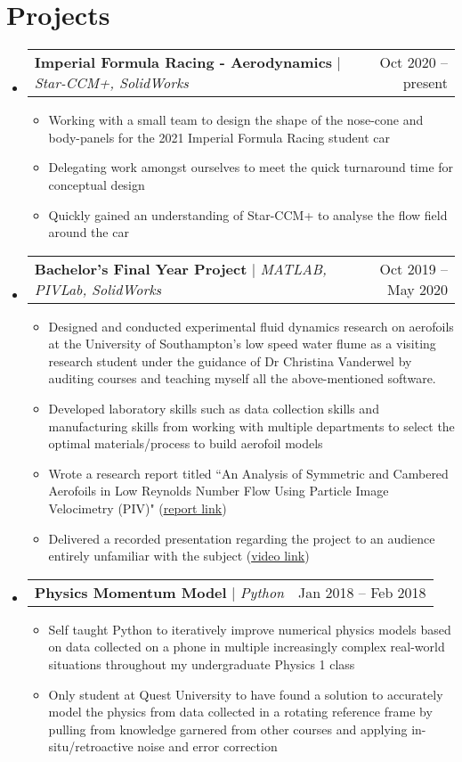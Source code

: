 \documentclass[a4paper,11pt]{article}
\makeatletter
\newcommand{\resumeItem}[1]{
  \item\small{
    {#1\vspace{-2pt}}
  }
}
\newcommand{\resumeProjectHeading}[2]{
    \item
    \begin{tabular*}{0.97\textwidth}{l@{\extracolsep{\fill}}r}
      \small#1 & #2 \\
    \end{tabular*}\vspace{-7pt}
}
\newcommand{\resumeSubHeadingListStart}{\begin{itemize}[leftmargin=0.15in, label={}]}
\newcommand{\resumeSubHeadingListEnd}{\end{itemize}}
\newcommand{\resumeItemListStart}{\begin{itemize}}
\newcommand{\resumeItemListEnd}{\end{itemize}\vspace{-5pt}}
\makeatother
\begin{document}
\section{Projects}
    \resumeSubHeadingListStart
    	\resumeProjectHeading
		    {\textbf{Imperial Formula Racing - Aerodynamics} $|$ \emph{Star-CCM+, SolidWorks}}{Oct 2020 -- present}
		    \resumeItemListStart
		    \resumeItem{Working with a small team to design the shape of the nose-cone and body-panels for the 2021 Imperial Formula Racing student car}
		    \resumeItem{Delegating work amongst ourselves to meet the quick turnaround time for conceptual design}
		    \resumeItem{Quickly gained an understanding of Star-CCM+ to analyse the flow field around the car}
    	\resumeItemListEnd
      \resumeProjectHeading
          {\textbf{Bachelor's Final Year Project} $|$ \emph{MATLAB, PIVLab, SolidWorks}}{Oct 2019 -- May 2020}
          \resumeItemListStart
            \resumeItem{Designed and conducted experimental fluid dynamics research on aerofoils at the University of Southampton's low speed water flume as a visiting research student under the guidance of Dr Christina Vanderwel by auditing courses and teaching myself all the above-mentioned software.}
            \resumeItem{Developed laboratory skills such as data collection skills and manufacturing skills from working with multiple departments to select the optimal materials/process to build aerofoil models}
            \resumeItem{Wrote a research report titled ``An Analysis of Symmetric and Cambered Aerofoils in Low Reynolds Number Flow Using Particle Image Velocimetry (PIV)" (\href{https://drive.google.com/file/d/1th33UTZoUYoP38C3OC4ezJcxHMo_1kH4/view?usp=sharing}{\underline{report link}})}
            \resumeItem{Delivered a recorded presentation regarding the project to an audience entirely unfamiliar with the subject (\href{https://www.youtube.com/watch?v=ADNtDKkZBnE}{\underline{video link}})}
          \resumeItemListEnd
      \resumeProjectHeading
          {\textbf{Physics Momentum Model} $|$ \emph{Python}}{Jan 2018 -- Feb 2018}
          \resumeItemListStart
            \resumeItem{Self taught Python to iteratively improve numerical physics models based on data collected on a phone in multiple increasingly complex real-world situations throughout my undergraduate Physics 1 class}
            \resumeItem{Only student at Quest University to have found a solution to accurately model the physics from data collected in a rotating reference frame by pulling from knowledge garnered from other courses and applying in-situ/retroactive noise and error correction}
          \resumeItemListEnd
    \resumeSubHeadingListEnd
    
\end{document}
